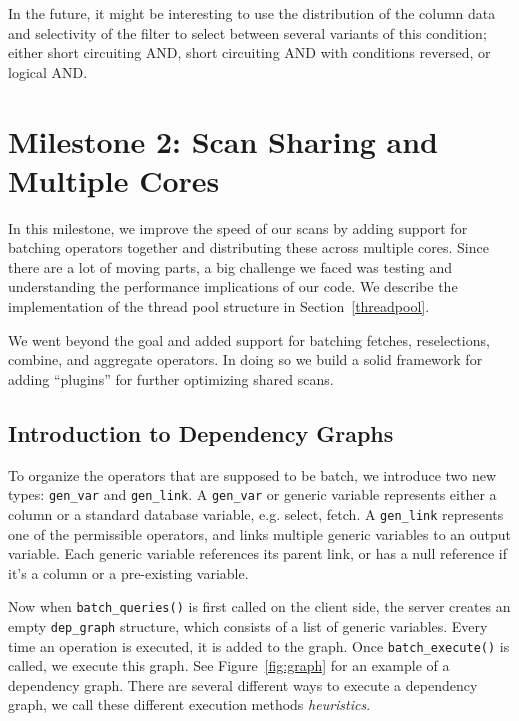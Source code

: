 \documentclass[a4paper, 12pt]{article}
\begin{document}
\medskip
In the future, it might be interesting to use the distribution of the column data and selectivity of the filter to select between several variants of this condition; either short circuiting AND, short circuiting AND with conditions reversed, or logical AND.

\section{Milestone 2: Scan Sharing and Multiple Cores}

In this milestone, we improve the speed of our scans by adding support for batching operators together and distributing these across multiple cores. Since there are a lot of moving parts, a big challenge we faced was testing and understanding the performance implications of our code. We describe the implementation of the thread pool structure in Section~\ref{threadpool}. 

\medskip
We went beyond the goal and added support for batching fetches, reselections, combine, and aggregate operators. In doing so we build a solid framework for adding ``plugins'' for further optimizing shared scans.

\subsection{Introduction to Dependency Graphs}

To organize the operators that are supposed to be batch, we introduce two new types: \texttt{gen\_var} and \texttt{gen\_link}. A \texttt{gen\_var} or generic variable represents either a column or a standard database variable, e.g. select, fetch. A \texttt{gen\_link} represents one of the permissible operators, and links multiple generic variables to an output variable. Each generic variable references its parent link, or has a null reference if it's a column or a pre-existing variable.

\medskip
Now when \texttt{batch\_queries()} is first called on the client side, the server creates an empty \texttt{dep\_graph} structure, which consists of a list of generic variables. Every time an operation is executed, it is added to the graph. Once \texttt{batch\_execute()} is called, we execute this graph. See Figure~\ref{fig:graph} for an example of a dependency graph. There are several different ways to execute a dependency graph, we call these different execution methods \textit{heuristics}.
\end{document}
